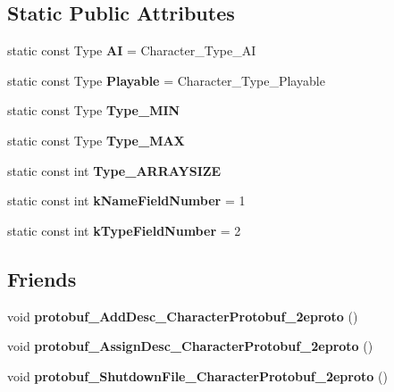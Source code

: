 \subsection*{Static Public Attributes}
\begin{DoxyCompactItemize}
\item 
static const Type {\bfseries AI} = Character\+\_\+\+Type\+\_\+\+AI\hypertarget{classCharacter_a3ad32850a517859558e5da9ea4411586}{}\label{classCharacter_a3ad32850a517859558e5da9ea4411586}

\item 
static const Type {\bfseries Playable} = Character\+\_\+\+Type\+\_\+\+Playable\hypertarget{classCharacter_ae1b7f26f131512bd88dc8d796ace7dca}{}\label{classCharacter_ae1b7f26f131512bd88dc8d796ace7dca}

\item 
static const Type {\bfseries Type\+\_\+\+M\+IN}
\item 
static const Type {\bfseries Type\+\_\+\+M\+AX}
\item 
static const int {\bfseries Type\+\_\+\+A\+R\+R\+A\+Y\+S\+I\+ZE}
\item 
static const int {\bfseries k\+Name\+Field\+Number} = 1\hypertarget{classCharacter_a21174aef26d652101417fa62e8dda531}{}\label{classCharacter_a21174aef26d652101417fa62e8dda531}

\item 
static const int {\bfseries k\+Type\+Field\+Number} = 2\hypertarget{classCharacter_aa703f9a654ef42746351dea516e3d83b}{}\label{classCharacter_aa703f9a654ef42746351dea516e3d83b}

\end{DoxyCompactItemize}
\subsection*{Friends}
\begin{DoxyCompactItemize}
\item 
void {\bfseries protobuf\+\_\+\+Add\+Desc\+\_\+\+Character\+Protobuf\+\_\+2eproto} ()\hypertarget{classCharacter_aa491aa56977170cd80caf7b8176ae84c}{}\label{classCharacter_aa491aa56977170cd80caf7b8176ae84c}

\item 
void {\bfseries protobuf\+\_\+\+Assign\+Desc\+\_\+\+Character\+Protobuf\+\_\+2eproto} ()\hypertarget{classCharacter_a510135aa7690c32c0b8f2f1b539199aa}{}\label{classCharacter_a510135aa7690c32c0b8f2f1b539199aa}

\item 
void {\bfseries protobuf\+\_\+\+Shutdown\+File\+\_\+\+Character\+Protobuf\+\_\+2eproto} ()\hypertarget{classCharacter_aa03453ef0dc13477cc670111c24af42a}{}\label{classCharacter_aa03453ef0dc13477cc670111c24af42a}

\end{DoxyCompactItemize}


